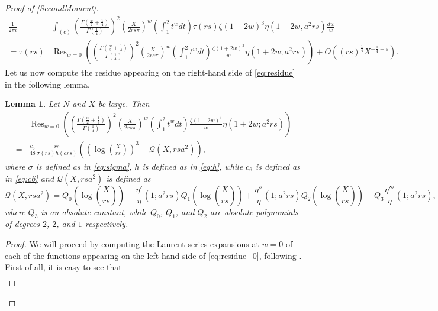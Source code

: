 \documentclass[10pt,a4paper]{amsart}
\def\CalQ{{\mathcal{Q}}}
\DeclareMathOperator*{\Res}{Res}
\theoremstyle{plain}
\newtheorem{lemma}[theorem]{Lemma}
\theoremstyle{definition}
\theoremstyle{remark}
\begin{document}
\begin{proof}[Proof of \cref{SecondMoment}]
\begin{equation}
\begin{aligned}
    \frac{1}{2 \pi i} &\int_{(c)}\left(\frac{\Gamma(\frac{w}{2}+\frac{1}{4})}{\Gamma(\frac{1}{4})}\right)^2\left(\frac{X}{2rs\pi}\right)^w\left(\int_{1}^{2}t^wdt\right)\tau(rs)\zeta(1+2w)^3\eta(1+2w,a^2rs)\frac{dw}{w} \\ =
\tau(rs) &\Res_{w=0} \left( \left(\frac{\Gamma(\frac{w}{2}+\frac{1}{4})}{\Gamma(\frac{1}{4})}\right)^2\left(\frac{X}{2rs\pi}\right)^w\left(\int_{1}^{2}t^wdt\right)\frac{\zeta(1+2w)^3}{w}\eta(1+2w;a^2rs) \right) + O((rs)^{\frac{1}{4}}X^{-\frac{1}{4}+\varepsilon}).
\end{aligned}
\end{equation}
Let us now compute the residue appearing on the right-hand side of \eqref{eq:residue} in the following lemma.
\begin{lemma}\label{residues}
    Let $N$ and $X$ be large. Then
\begin{equation}
\label{eq:residue_0}
\begin{aligned}
&\Res_{w=0}\left( \left(\frac{\Gamma(\frac{w}{2}+\frac{1}{4})}{\Gamma(\frac{1}{4})}\right)^2\left(\frac{X}{2rs\pi}\right)^w\left(\int_{1}^{2}t^wdt\right)\frac{\zeta(1+2w)^3}{w}\eta(1+2w;a^2rs)\right)
\\ = &\frac{c_6}{48} \frac{rs}{\sigma(rs)h(ars)}\left( \left(\log\left(\frac{X}{rs}\right) \right)^3 +\CalQ(X,rsa^2)\right),
\end{aligned}
\end{equation}
where $\sigma$ is defined as in \eqref{eq:sigma}, $h$ is defined as in \eqref{eq:h}, while $c_6$ is defined as in \eqref{eq:c6} and $\mathcal{Q}(X,rsa^2)$ is defined as
\begin{equation*}
\CalQ(X,rsa^2)= Q_0\left(\log\left(\frac{X}{rs}\right)\right)
+\frac{\eta'}{\eta}
(1;a^2rs)Q_1\left(\log\left(\frac{X}{rs}\right)\right)
+ \frac{\eta''}{\eta}(1;a^2rs)Q_2\left(\log\left(\frac{X}{rs}\right)\right)+Q_3\frac{\eta'''}{\eta}(1;a^2rs),
\end{equation*}
where $Q_3$ is an absolute constant, while $Q_0$, $Q_1$, and $Q_2$ are absolute polynomials of degrees $2$, $2$, and $1$ respectively.
\end{lemma}
\begin{proof}
    We will proceed by computing the Laurent series expansions at $w = 0$ of each of the functions appearing on the left-hand side of \eqref{eq:residue_0}, following \cite[Section~5.1]{Soundararajan_2000}.
    First of all, it is easy to see that
    \[
        \begin{aligned}

\end{aligned}\]
\end{proof}
\end{proof}
\end{document}
